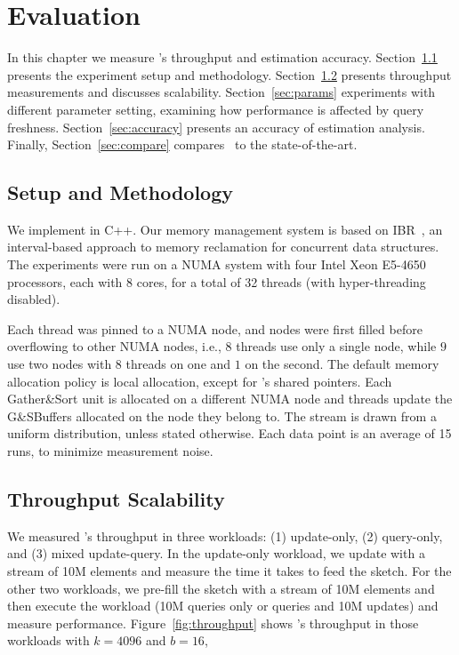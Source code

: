 \chapter{Evaluation}
\label{chap:eval}

In this chapter we measure \mysketch's throughput and estimation accuracy. 
Section~\ref{sec:setup} presents the experiment setup and methodology.
Section~\ref{sec:tput} presents throughput measurements and discusses scalability.
Section~\ref{sec:params} experiments with different parameter setting, examining how performance is affected by query freshness. 
Section~\ref{sec:accuracy} presents an accuracy of estimation analysis.
Finally, Section~\ref{sec:compare} compares \mysketch\ to the state-of-the-art. 

\section{Setup and Methodology}
\label{sec:setup}
We implement \mysketch in C++. Our memory management system is based on IBR~\cite{Haosen_2018_IBR}, an interval-based approach to memory reclamation for concurrent data structures. 
The experiments were run on a NUMA system with four Intel Xeon E5-4650 processors, each with 8 cores, for a total of 32 threads (with hyper-threading disabled).


Each thread was pinned to a NUMA node, and nodes were first filled before overflowing to other NUMA nodes, i.e., $8$ threads use only a single node, while $9$ use two nodes with $8$ threads on one and $1$ on the second. The default memory allocation policy is local allocation, except for \mysketch's shared pointers. Each Gather\&Sort unit is allocated on a different NUMA node and threads update the G\&SBuffers allocated on the node they belong to.
The stream is drawn from a uniform distribution, unless stated otherwise. Each data point is an average of 15 runs, to minimize measurement noise.

 
\section{Throughput Scalability}
\label{sec:tput} 
We measured \mysketch's throughput in three workloads:
(1) update-only, (2) query-only, and (3) mixed update-query. In the update-only workload, we update \mysketch with a stream of 10M elements and measure the time it takes to feed the sketch. For the other two workloads, we pre-fill the sketch with a stream of 10M elements and then execute the workload (10M queries only or queries and 10M updates) and measure performance. Figure~\ref{fig:throughput} shows \mysketch's throughput in those workloads with $k = 4096$ and $b = 16$,

